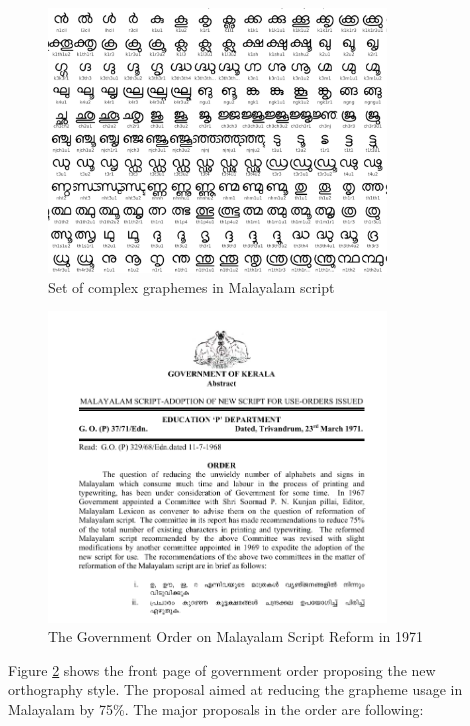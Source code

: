 \documentclass[10pt]{article}
\begin{document}
\begin{figure}[h!]
	\centering
	\includegraphics[width=0.8\textwidth]{images/complexgraphemes.png}
	\caption{Set of complex graphemes in Malayalam script}
	\label{complexgrapheme}
\end{figure}


\begin{figure}[h!]
	\centering
	\includegraphics[width=0.8\textwidth]{images/1971-gov-script-reformation-order.png}
	\caption{The Government Order on Malayalam Script Reform in 1971}
	\label{go1971}
\end{figure}

Figure \ref{go1971} shows the front page of government order proposing the new orthography style. The proposal aimed at reducing the grapheme usage in Malayalam by 75\%. The major proposals in the order are following: \cite{1971go}
\end{document}
